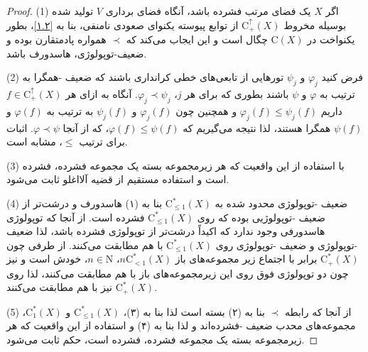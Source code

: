 \documentclass[12pt,a4paper]{article}
\theoremstyle{definition}
\theoremstyle{theorem}
\theoremstyle{definition}
\newcommand{\rC}{\mathrm{C}}
\begin{document}
\begin{proof}
 (1) اگر 
$ X $
یک فضای مرتب فشرده باشد، آنگاه فضای برداری 
$ V $
تولید شده بوسیله مخروط 
$ \rC_{+}^{\uparrow}(X) $
از توابع پیوسته یکنوای صعودی   نامنفی، بنا به
\ref{۱.۲}، بطور یکنواخت در 
$ \rC(X) $
چگال است و این ایجاب می‌کند که 
$ \prec $
همواره پادمتقارن بوده و
\linebreak
ضعیف\lr{**}-توپولوژی، هاسدورف باشد. 

 (2) فرض کنید 
$\varphi_{j}  $
و
$ \psi_{j} $
تورهایی از تابعی‌های خطی کرانداری باشند که 
\linebreak
ضعیف \lr{*}-همگرا به ترتیب به
$ \varphi $
و
$ \psi $
باشند بطوری که برای هر 
$ j $،   
$ \varphi_{j}\prec \psi_{j}$. آنگاه به ازای هر 
$ f\in  \rC_{+}^{\uparrow}(X)$
داریم
$ \varphi_{j}(f)\leq \psi_{j}(f)$
و همچنین چون 
$ \varphi_{j}(f) $
و
$ \psi_{j}(f) $
به ترتیب به 
$ \varphi(f) $
و
$ \psi(f) $
همگرا هستند، لذا نتیجه می‌گیریم که 
$ \varphi(f)\leq \psi(f) $، که از آنجا
$ \varphi\prec \psi $. اثبات برای ترتیب 
$ \leq $، مشابه است.

(3)  با استفاده از این واقعیت که هر زیرمجموعه بسته یک مجموعه فشرده، فشرده است و استفاده مستقیم از قضیه آلااغلو
ثابت می‌شود.

(4)  ضعیف 
 \lr{**}
-توپولوژی محدود شده به 
$\mathrm{C}_{\leq1}^{*}(X)   $
بنا به (۱) هاسدورف و درشت‌تر از 
ضعیف 
 \lr{*}
-توپولوژیی بوده که روی 
$\mathrm{C}_{\leq1}^{*}(X)   $
فشرده است. از آنجا که توپولوژی هاسدورفی وجود ندارد که اکیداً درشت‌تر از توپولوژی فشرده باشد، لذا 
ضعیف 
 \lr{*}
-توپولوژی و
\linebreak
ضعیف 
 \lr{**}
-توپولوژی روی 
$\mathrm{C}_{\leq1}^{*}(X)   $
با هم مطابقت می‌کنند. از طرفی چون 
$\mathrm{C}_{+}^{*}(X)   $
برابر با اجتماع زیر مجموعه‌های باز 
$ n\mathrm{C}_{<1}^{*}(X)  $، $ n\in \mathrm{N} $،  خودش است  و نیز چون دو توپولوژی فوق روی این زیرمجموعه‌های باز با هم مطابقت می‌کنند، لذا روی 
$\mathrm{C}_{+}^{*}(X)   $
نیز با هم مطابقت می‌کنند.

 (5)  از آنجا که رابطه 
$ \prec $
بنا به (۲) بسته است لذا بنا به (۳)، $ \mathrm{C}_{\leq1}^{*}(X) $
و
$ \mathrm{C}_{1}^{*}(X) $، مجموعه‌های محدب ضعیف 
 \lr{*}
 -فشرده‌اند و لذا بنا به 
 (۴) و استفاده از این واقعیت که هر زیرمجموعه بسته یک مجموعه فشرده، فشرده است، حکم ثابت می‌شود.
\end{proof}
\end{document}
